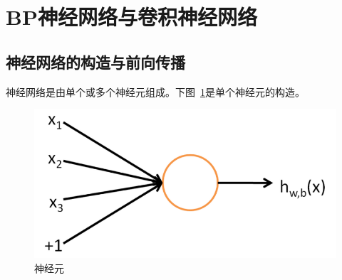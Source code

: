\section{BP神经网络与卷积神经网络}
\subsection{神经网络的构造与前向传播}
神经网络是由单个或多个神经元组成。下图~\ref{fig:bp1}是单个神经元的构造。
\begin{figure}[htb]
\centering
\includegraphics[scale=0.5]{../figures/NN1.png}
\caption{神经元}
\label{fig:bp1}
\end{figure}



